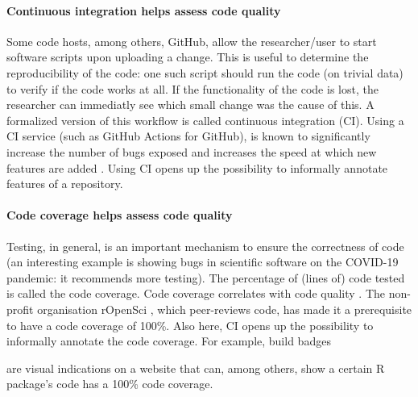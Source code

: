 
\paragraph{Continuous integration helps assess code quality}

Some code hosts, among others, GitHub, 
allow the researcher/user to start software scripts upon uploading a change.
This is useful to determine the reproducibility of the code: 
one such script should run the code (on trivial data) 
to verify if the code works at all.
If the functionality of the code is lost, the researcher
can immediatly see which small change was the cause of this.
A formalized version of this workflow is called continuous integration (CI).
Using a CI service (such as GitHub Actions for GitHub), 
is known to significantly 
increase the number of bugs exposed \cite{vasilescu2015} and increases
the speed at which new features are added \cite{vasilescu2015}.
Using CI opens up the possibility to informally annotate features of
a repository. 

\paragraph{Code coverage helps assess code quality}

Testing, in general, is an important mechanism to ensure
the correctness of code (an interesting example is \cite{rahman2020exploratory}
showing bugs in scientific software on the COVID-19 pandemic:
it recommends more testing).
The percentage of (lines of) code tested is called the code coverage.
Code coverage correlates with code quality \cite{horgan1994,del1995correlation}. 
The non-profit organisation rOpenSci \cite{ram2018community},
which peer-reviews code,
has made it a prerequisite to have a code coverage of 100\%.
Also here, CI opens up the possibility to informally annotate the
code coverage. 
For example, build badges

are visual indications on a website that can, among others,
show a certain R package's code has a 100\% code coverage.

